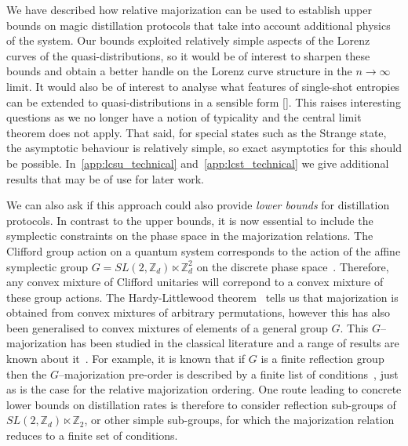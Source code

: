 \documentclass[pra,
aps,
twocolumn,
superscriptaddress,
groupedaddress,
nofootinbib,
reprint
]{revtex4-1}
\begin{document}
We have described how relative majorization can be used to establish upper bounds on magic distillation protocols that take into account additional physics of the system. Our bounds exploited relatively simple aspects of the Lorenz curves of the quasi-distributions, so it would be of interest to sharpen these bounds and obtain a better handle on the Lorenz curve structure in the $n\rightarrow \infty$ limit. It would also be of interest to analyse what features of single-shot entropies can be extended to quasi-distributions in a sensible form []. This raises interesting questions as we no longer have a notion of typicality and the central limit theorem does not apply. That said, for special states such as the Strange state, the asymptotic behaviour is relatively simple, so exact asymptotics for this should be possible. In~\cref{app:lcsu_technical} and~\cref{app:lcst_technical} we give additional results that may be of use for later work.

We can also ask if this approach could also provide \emph{lower bounds} for distillation protocols. In contrast to the upper bounds, it is now essential to include the symplectic constraints on the phase space in the majorization relations. The Clifford group action on a quantum system corresponds to the action of the affine symplectic group $G=SL(2,\mathbb{Z}_d) \ltimes \mathbb{Z}_d^2$ on the discrete phase space~\cite{cit:gross3, cit:bengtsson}. Therefore, any convex mixture of Clifford unitaries will correpond to a convex mixture of these group actions. The Hardy-Littlewood theorem~\cite{hardy_1952} tells us that majorization is obtained from convex mixtures of arbitrary permutations, however this has also been generalised to convex mixtures of elements of a general group $G$. This $G$--majorization has been studied in the classical literature and a range of results are known about it~\cite{giovagnoli_1985, steerneman_1990, eaton_1977}. For example, it is known that if $G$ is a finite reflection group then the $G$--majorization pre-order is described by a finite list of conditions~\cite{giovagnoli_1985}, just as is the case for the relative majorization ordering. One route leading to concrete lower bounds on distillation rates is therefore to consider reflection sub-groups of $SL(2,\mathbb{Z}_d) \ltimes \mathbb{Z}_2$, or other simple sub-groups, for which the majorization relation reduces to a finite set of conditions.
  
\end{document}
